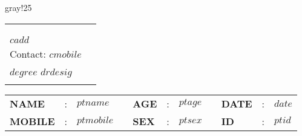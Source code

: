 \documentclass[12pt]{article}
\newcommand{\patientName}{$ ptname $}
\newcommand{\prescriptionID}{$ ptid $}
\begin{document}
\thispagestyle{plain}

\setlength{\columnsep}{0.3in}
\setcolumnwidth{4in, 4in}

\begin{colbackbox}{gray!25}
\begin{tabular}{l | l}
\multicolumn{2}{l}{}\\
\begin{minipage}{0.47\textwidth}
        \begin{flushleft}
            \onehalfspacing
            {\LARGE \textbf{Chamber:}} \\
            \textit{\textbf{$ cname $\\
            $ cadd $ \\
            Contact: $ cmobile $} }
        \end{flushleft}
\end{minipage}
&
\begin{minipage}{0.47\textwidth}
        \begin{flushright}
             {\fontsize{13}{13}\selectfont\bf $ drname $}\\
             \vspace*{0.1in}
             {\fontsize{10}{10}\selectfont $ degree $}
             {\fontsize{10}{10}\selectfont $ drdesig $}\\
        \end{flushright}
\end{minipage}
\vspace*{0.2in}
\end{tabular}
\end{colbackbox}

\setcolumnwidth{2in, 4in}
\vspace*{-0.5cm}
\noindent\textcolor{KUrod}{\makebox[\linewidth]{\rule{\paperwidth}{0.4pt}}}
\vspace*{0.05cm}
\begin{paracol}{2}
\centering
    \begin{table}
        \begin{tabular}{p{0.8in}p{0.05in}p{1.5in}p{0.1in}p{0.4in}p{0.05in}p{0.3in}p{0.1in}p{0.5in}p{0.05in}p{1.0in}}
            {\bf NAME}   & : & {\em \patientName}  &  & {\bf AGE}  & : & {\em $ ptage $}    &            & {\bf DATE} & : & {\em $ date $}         \\
            {\bf MOBILE} & : & {\em $ ptmobile $} &  & {\bf SEX} & : & {\em $ ptsex $} & & {\bf ID}  & : & {\em \prescriptionID}
        \end{tabular}
    \end{table}
\end{paracol}
\end{document}
